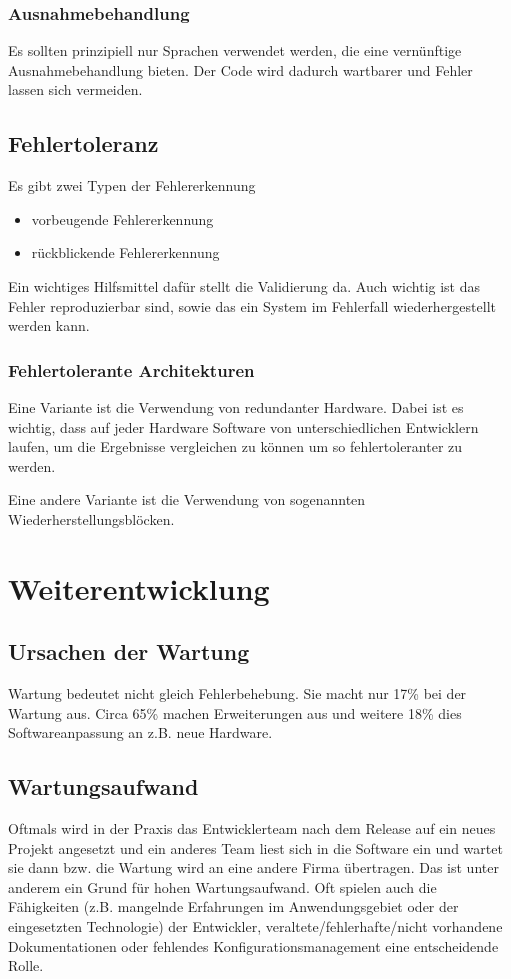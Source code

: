 \subsubsection{Ausnahmebehandlung}
Es sollten prinzipiell nur Sprachen verwendet werden, die eine vernünftige Ausnahmebehandlung bieten. Der Code wird dadurch wartbarer und Fehler lassen sich vermeiden.

\subsection{Fehlertoleranz}
Es gibt zwei Typen der Fehlererkennung
\begin{itemize}
\item vorbeugende Fehlererkennung
\item rückblickende Fehlererkennung
\end{itemize}

Ein wichtiges Hilfsmittel dafür stellt die Validierung da. Auch wichtig ist das Fehler reproduzierbar sind, sowie das ein System im Fehlerfall wiederhergestellt werden kann.  


\subsubsection{Fehlertolerante Architekturen}
Eine Variante ist die Verwendung von redundanter Hardware. Dabei ist es wichtig, dass auf jeder Hardware Software von unterschiedlichen Entwicklern laufen, um die Ergebnisse vergleichen zu können um so fehlertoleranter zu werden.

Eine andere Variante ist die Verwendung von sogenannten Wiederherstellungsblöcken.

\section{Weiterentwicklung}
\subsection{Ursachen der Wartung}
Wartung bedeutet nicht gleich Fehlerbehebung. Sie macht nur 17\% bei der Wartung aus. Circa 65\% machen Erweiterungen aus und weitere 18\% dies Softwareanpassung an z.B. neue Hardware.

\subsection{Wartungsaufwand}
Oftmals wird in der Praxis das Entwicklerteam nach dem Release auf ein neues Projekt angesetzt und ein anderes Team liest sich in die Software ein und wartet sie dann bzw. die Wartung wird an eine andere Firma übertragen. Das ist unter anderem ein Grund für hohen Wartungsaufwand. Oft spielen auch die Fähigkeiten (z.B. mangelnde Erfahrungen im Anwendungsgebiet oder der eingesetzten Technologie) der Entwickler, veraltete/fehlerhafte/nicht vorhandene Dokumentationen oder fehlendes Konfigurationsmanagement eine entscheidende Rolle.

